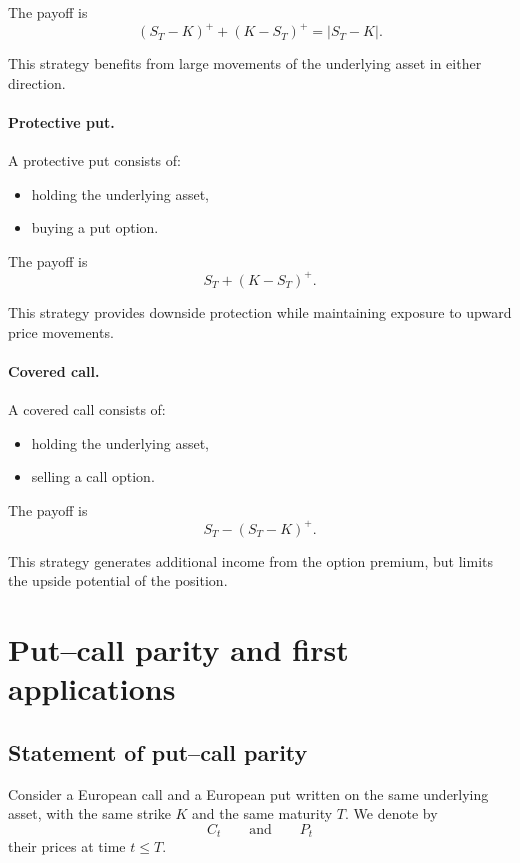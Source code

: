 \documentclass[11pt]{article}
\newcommand{\1}{\mathbf{1}}
\theoremstyle{plain}
\theoremstyle{definition}
\theoremstyle{remark}
\begin{document}
The payoff is
\[
(S_T-K)^+ + (K-S_T)^+ = |S_T-K|.
\]

This strategy benefits from large movements of the underlying asset
in either direction.

\paragraph{Protective put.}

A protective put consists of:
\begin{itemize}[leftmargin=1.4em]
    \item holding the underlying asset,
    \item buying a put option.
\end{itemize}

The payoff is
\[
S_T + (K-S_T)^+.
\]

This strategy provides downside protection while maintaining
exposure to upward price movements.

\paragraph{Covered call.}

A covered call consists of:
\begin{itemize}[leftmargin=1.4em]
    \item holding the underlying asset,
    \item selling a call option.
\end{itemize}

The payoff is
\[
S_T - (S_T-K)^+.
\]

This strategy generates additional income from the option premium,
but limits the upside potential of the position.

\section{Put--call parity and first applications}

\subsection{Statement of put--call parity}

Consider a European call and a European put written on the same underlying asset,
with the same strike \(K\) and the same maturity \(T\).
We denote by
\[
C_t \qquad\text{and}\qquad P_t
\]
their prices at time \(t\le T\).
\end{document}

